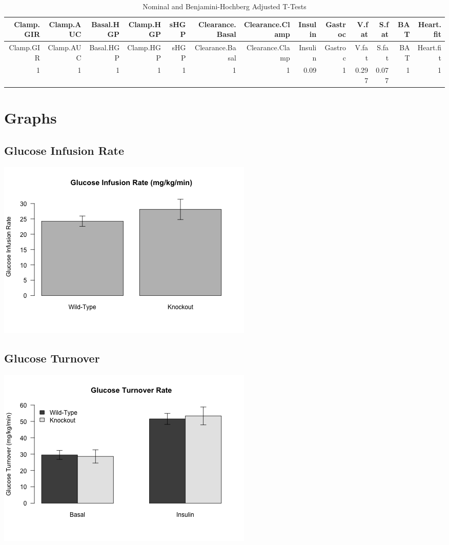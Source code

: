 \documentclass[]{article}
\begin{document}
\begin{longtable}[]{@{}rrrrrrrrrrrrr@{}}
\caption{Nominal and Benjamini-Hochberg Adjusted T-Tests}\tabularnewline
\toprule
Clamp.GIR & Clamp.AUC & Basal.HGP & Clamp.HGP & sHGP & Clearance.Basal &
Clearance.Clamp & Insulin & Gastroc & V.fat & S.fat & BAT &
Heart.fit\tabularnewline
\midrule
\endfirsthead
\toprule
Clamp.GIR & Clamp.AUC & Basal.HGP & Clamp.HGP & sHGP & Clearance.Basal &
Clearance.Clamp & Insulin & Gastroc & V.fat & S.fat & BAT &
Heart.fit\tabularnewline
\midrule
\endhead
1 & 1 & 1 & 1 & 1 & 1 & 1 & 0.09 & 1 & 0.297 & 0.077 & 1 &
1\tabularnewline
\bottomrule
\end{longtable}

\section{Graphs}\label{graphs}

\subsection{Glucose Infusion Rate}\label{glucose-infusion-rate}

\includegraphics{figures/gir-1.png}

\subsection{Glucose Turnover}\label{glucose-turnover}

\includegraphics{figures/glucose-turnover-1.png}
\end{document}
